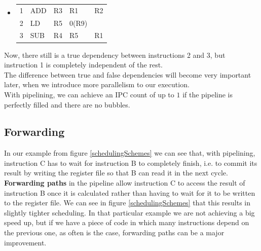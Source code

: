 \documentclass[12pt,a4paper]{article}
\newenvironment {assembly}{\begingroup \ttfamily \color{Orange} \begin{itemize} \item[]}{\end{itemize}\endgroup}
\begin{document}
\begin{assembly}
	\begin{tabularx} {\textwidth} {l l a a X}
		1 & ADD & R3 & R1		& R2 \\
		2 & LD  & R5 & 0(R9)	& \\
		3 & SUB & R4 & R5		& R1\\
	\end{tabularx}
\end{assembly}
Now, there still is a true dependency between instructions 2 and 3, but instruction 1 is completely independent of the rest. \\
The difference between true and false dependencies will become very important later, when we introduce more parallelism to our execution.\\

With pipelining, we can achieve an IPC count of up to $1$ if the pipeline is perfectly filled and there are no bubbles.

\subsection{Forwarding}
In our example from figure \ref{schedulingSchemes} we can see that, with pipelining, instruction C has to wait for instruction B to completely finish, i.e. to commit its result by writing the register file so that B can read it in the next cycle. \\
\textbf{Forwarding paths} in the pipeline allow instruction C to access the result of instruction B once it is calculated rather than having to wait for it to be written to the register file. We can see in figure \ref{schedulingSchemes} that this results in slightly tighter scheduling. In that particular example we are not achieving a big speed up, but if we have a piece of code in which many instructions depend on the previous one, as often is the case, forwarding paths can be a major improvement.
\end{document}
